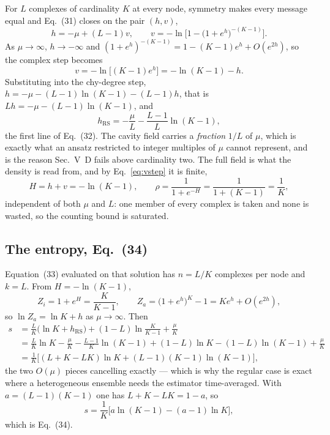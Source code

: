 \documentclass[aps,pre,onecolumn,superscriptaddress,floatfix,nofootinbib]{revtex4-2}
\begin{document}
For $L$ complexes of cardinality $K$ at every node, symmetry makes every
message equal and Eq.~(31) closes on the pair $(h,v)$,
\begin{equation}
  h=-\mu+(L-1)v,\qquad
  v=-\ln\Big[1-\big(1+e^{h}\big)^{-(K-1)}\Big].
\end{equation}
As $\mu\to\infty$, $h\to-\infty$ and
$(1+e^{h})^{-(K-1)}=1-(K-1)e^{h}+O(e^{2h})$, so the complex step becomes
\begin{equation}
  v=-\ln\big[(K-1)e^{h}\big]=-\ln(K-1)-h .
  \label{eq:vstep}
\end{equation}
Substituting into the chy-degree step, $h=-\mu-(L-1)\ln(K-1)-(L-1)h$, that is
$Lh=-\mu-(L-1)\ln(K-1)$, and
\begin{equation}
  h_{\mathrm{RS}}=-\frac{\mu}{L}-\frac{L-1}{L}\ln(K-1),
\end{equation}
the first line of Eq.~(32). The cavity field carries a \emph{fraction} $1/L$ of
$\mu$, which is exactly what an ansatz restricted to integer multiples of $\mu$
cannot represent, and is the reason Sec.~V~D fails above cardinality two. The
full field is what the density is read from, and by
Eq.~\eqref{eq:vstep} it is finite,
\begin{equation}
  H=h+v=-\ln(K-1),\qquad
  \rho=\frac{1}{1+e^{-H}}=\frac{1}{1+(K-1)}=\frac1K ,
\end{equation}
independent of both $\mu$ and $L$: one member of every complex is taken and none
is wasted, so the counting bound is saturated.

\subsection{The entropy, Eq.~(34)}

Equation~(33) evaluated on that solution has $n=L/K$ complexes per node and
$k=L$. From $H=-\ln(K-1)$,
\begin{equation}
  Z_i=1+e^{H}=\frac{K}{K-1},
  \qquad
  Z_a=\big(1+e^{h}\big)^{K}-1=Ke^{h}+O(e^{2h}),
\end{equation}
so $\ln Z_a=\ln K+h$ as $\mu\to\infty$. Then
\begin{equation}
  \begin{split}
  s&=\frac{L}{K}\big(\ln K+h_{\mathrm{RS}}\big)
     +(1-L)\ln\frac{K}{K-1}+\frac{\mu}{K}\\
   &=\frac{L}{K}\ln K-\frac{\mu}{K}-\frac{L-1}{K}\ln(K-1)
     +(1-L)\ln K-(1-L)\ln(K-1)+\frac{\mu}{K}\\
   &=\frac{1}{K}\Big[(L+K-LK)\ln K+(L-1)(K-1)\ln(K-1)\Big],
  \end{split}
\end{equation}
the two $O(\mu)$ pieces cancelling exactly --- which is why the regular case is
exact where a heterogeneous ensemble needs the estimator time-averaged. With
$a=(L-1)(K-1)$ one has $L+K-LK=1-a$, so
\begin{equation}
  s=\frac{1}{K}\Big[a\ln(K-1)-(a-1)\ln K\Big],
\end{equation}
which is Eq.~(34).
\end{document}
